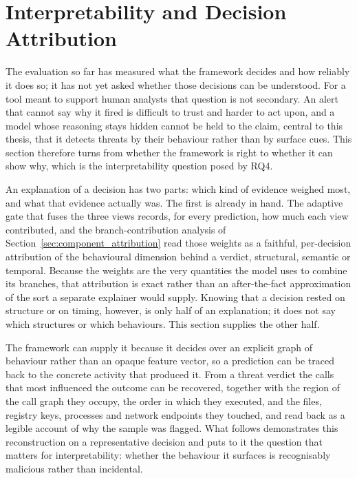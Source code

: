 \documentclass[%
    BCOR=10mm,
    DIV=13,
    toc=bibliography,
    toc=listof,
    oneside,
    12pt,
]{scrbook}
\begin{document}
\section{Interpretability and Decision Attribution}
\label{sec:interpretability_results}

The evaluation so far has measured what the framework decides and how reliably it
does so; it has not yet asked whether those decisions can be understood. For a tool
meant to support human analysts that question is not secondary. An alert that
cannot say why it fired is difficult to trust and harder to act upon, and a model
whose reasoning stays hidden cannot be held to the claim, central to this thesis,
that it detects threats by their behaviour rather than by surface cues. This
section therefore turns from whether the framework is right to whether it can show
why, which is the interpretability question posed by RQ4.

An explanation of a decision has two parts: which kind of evidence weighed most,
and what that evidence actually was. The first is already in hand. The adaptive
gate that fuses the three views records, for every prediction, how much each view
contributed, and the branch-contribution analysis of
Section~\ref{sec:component_attribution} read those weights as a faithful,
per-decision attribution of the behavioural dimension behind a verdict, structural,
semantic or temporal. Because the weights are the very quantities the model uses to
combine its branches, that attribution is exact rather than an after-the-fact
approximation of the sort a separate explainer would supply. Knowing that a
decision rested on structure or on timing, however, is only half of an explanation;
it does not say which structures or which behaviours. This section supplies the
other half.

The framework can supply it because it decides over an explicit graph of behaviour
rather than an opaque feature vector, so a prediction can be traced back to the
concrete activity that produced it. From a threat verdict the calls that most
influenced the outcome can be recovered, together with the region of the call graph
they occupy, the order in which they executed, and the files, registry keys,
processes and network endpoints they touched, and read back as a legible account of
why the sample was flagged. What follows demonstrates this reconstruction on a
representative decision and puts to it the question that matters for
interpretability: whether the behaviour it surfaces is recognisably malicious
rather than incidental.
\end{document}
